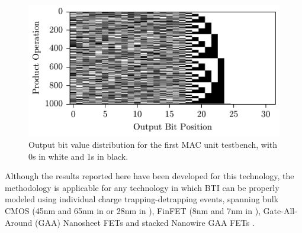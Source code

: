 \begin{figure}[!t]
    \includegraphics{images/ch2/MAC_bit_distribution.pdf}
    \caption{Output bit value distribution for the first MAC unit testbench, with 0s in white and 1s in black. }
    \label{fig:MAC_bit_dist}
\end{figure}
Although the results reported here have been developed for this technology, the methodology is applicable for any technology in which \gls{BTI} can be properly modeled using individual charge trapping-detrapping events, spanning bulk CMOS (45nm and 65nm in \cite{procelDefectCentricPerspectiveChannel2015} or 28nm in \cite{kaczerDefectcentricPerspectiveDevice2015}), FinFET (8nm and 7nm in \cite{jiangTimeDependentVariability2021a}), Gate-All-Around (GAA) Nanosheet FETs \cite{choudhuryAnalysisBTISHE2020} and stacked Nanowire GAA FETs \cite{chasinBTIReliabilityTimedependent2017}. 

